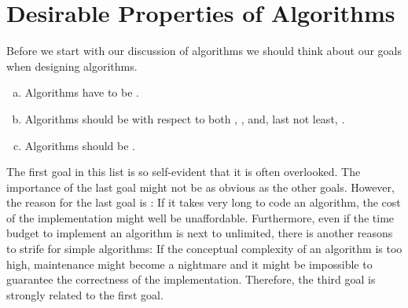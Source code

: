 \section{Desirable Properties of Algorithms}
Before we start with our discussion of algorithms we should think about our goals when designing
algorithms.  
\begin{enumerate}[(a)]
\item Algorithms have to be .
\item Algorithms should be  with respect to both , , and,
      last not least, .
\item Algorithms should be .
\end{enumerate}
The first goal in this list is so self-evident that it is often overlooked.  The
importance of the last goal might not be as obvious as the other goals.
However, the reason for the last goal is :  If it takes very long to code an algorithm, the
cost of the implementation might well be unaffordable.  Furthermore, even if the time budget to implement an
algorithm is next to unlimited,  there is another reasons to strife for simple algorithms:  If the conceptual
complexity of an algorithm is too high, maintenance might become a nightmare and it might be impossible to
guarantee the correctness of the implementation.  Therefore, the third goal is strongly related to the first goal.  

